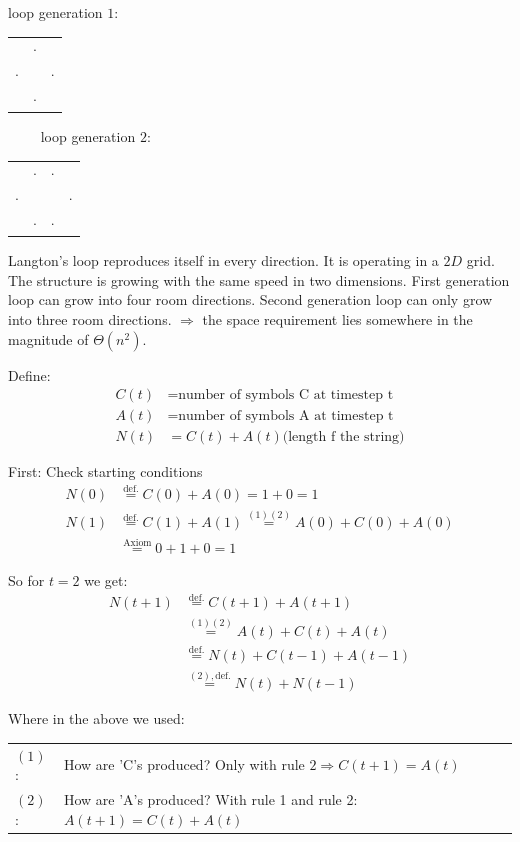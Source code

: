 \documentclass[10pt,a4paper,boxed]{hmcpset}
\begin{document}
\begin{problem}[Assignment 26]
\end{problem}
\begin{solution}
loop generation $1:$
\begin{tabular}{ccc}
 & $\cdot$ & \tabularnewline
\cline{2-2} 
\multicolumn{1}{c|}{$\cdot$} & \multicolumn{1}{c|}{} & $\cdot$\tabularnewline
\cline{2-2} 
 & $\cdot$ & \tabularnewline
\end{tabular}
$\qquad$ loop generation $2:$
\begin{tabular}{cccc}
 & $\cdot$ & $\cdot$ & \tabularnewline
\cline{2-3} 
\multicolumn{1}{c|}{$\cdot$} & \multicolumn{1}{c|}{} & \multicolumn{1}{c|}{} & $\cdot$\tabularnewline
\cline{2-3} 
 & $\cdot$ & $\cdot$ & \tabularnewline
\end{tabular}

Langton's loop reproduces itself in every direction. It is operating in a $2D$ grid. The structure is growing with the same speed in two dimensions.
First generation loop can grow into four room directions. Second generation loop can only grow into three room directions.
$\Rightarrow$ the space requirement lies somewhere in the magnitude of $\Theta \left( n^2 \right)$.
\end{solution}

\begin{problem}[Assignment 27]
\end{problem}
\begin{solution}
Define:
\begin{align*}
	C(t) & = \mbox{number of symbols C at timestep t} \\
	A(t) & = \mbox{number of symbols A at timestep t} \\
	N(t) & = C(t)+A(t) \mbox{(length f the string)}
\end{align*}

First: Check starting conditions
\begin{align*}
	N(0) & \overset{\mbox{def.}}{=} C(0) + A(0) = 1+0 = 1 \\
	N(1) & \overset{\mbox{def.}}{=} C(1) + A(1) \overset{(1)(2)}{=} A(0)+C(0)+A(0) \\
		 & \overset{\mbox{Axiom}}{=} 0+1+0 = 1
\end{align*}

So for $t=2$ we get:
\begin{align*}
	N(t+1) & \overset{\mbox{def.}}{=} C(t+1) + A(t+1) \\
		   & \overset{(1)(2)}{=} A(t) + C(t) + A(t) \\
		   & \overset{\mbox{def.}}{=} N(t) + C(t-1) + A(t-1) \\
		   & \overset{(2), \mbox{def.}}{=} N(t) + N(t-1) 
\end{align*}

Where in the above we used:

\begin{tabular}{ll}
$(1)$: & How are 'C's produced? Only with rule $2 \Rightarrow C(t+1)=A(t)$ \\ 
$(2)$: & How are 'A's produced? With rule 1 and rule 2: $A(t+1)=C(t)+A(t)$ \\ 
\end{tabular} 
 \end{solution}
\end{document}
